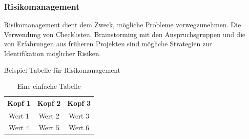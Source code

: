 \documentclass[main.tex]{subfiles} %
\begin{document}
\subsubsection{Risikomanagement}
Risikomanagement dient dem Zweck, mögliche Probleme vorwegzunehmen. Die Verwendung von
Checklisten, Brainstorming mit den Anspruchsgruppen und die von Erfahrungen
aus früheren Projekten sind mögliche Strategien zur Identifikation möglicher Risiken.

\begin{table}[h]
    \centering
    \caption{Beispiel-Tabelle für Risikomanagement}
    \begin{tabular}{|c|c|c|}
        \hline
        Kopf 1 & Kopf 2 & Kopf 3 \\
        \hline
        Wert 1 & Wert 2 & Wert 3 \\
        \hline
        Wert 4 & Wert 5 & Wert 6 \\
        \hline
    \end{tabular}
    \caption{Eine einfache Tabelle}
    \label{tab:meineTabelle}

\end{table}
\end{document}

